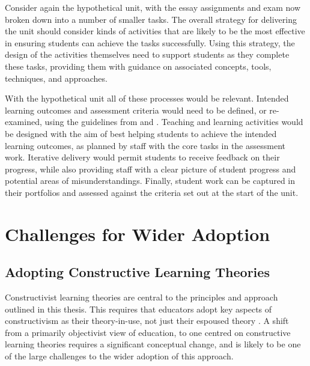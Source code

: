 Consider again the hypothetical unit, with the essay assignments and exam now broken down into a number of smaller tasks. The overall strategy for delivering the unit should consider kinds of activities that are likely to be the most effective in ensuring students can achieve the tasks successfully. Using this strategy, the design of the activities themselves need to support students as they complete these tasks, providing them with guidance on associated concepts, tools, techniques, and approaches.

With the hypothetical unit all of these processes would be relevant. Intended learning outcomes and assessment criteria would need to be defined, or re-examined, using the guidelines from  and . Teaching and learning activities would be designed with the aim of best helping students to achieve the intended learning outcomes, as planned by staff with the core tasks in the assessment work. Iterative delivery would permit students to receive feedback on their progress, while also providing staff with a clear picture of student progress and potential areas of misunderstandings. Finally, student work can be captured in their portfolios and assessed against the criteria set out at the start of the unit.





\section{Challenges for Wider Adoption} %
\label{sec:challenges_for_wider_adoption}

\subsection{Adopting Constructive Learning Theories} %
\label{sub:adopting_constructive_learning_theories}

Constructivist learning theories are central to the principles and approach outlined in this thesis. This requires that educators adopt key aspects of constructivism as their theory-in-use, not just their espoused theory \cite{Argyris:1976}. A shift from a primarily objectivist view of education, to one centred on constructive learning theories requires a significant conceptual change, and is likely to be one of the large challenges to the wider adoption of this approach.  

